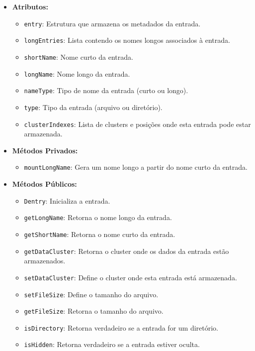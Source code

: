 \documentclass[
    12pt,				%
    oneside,   	        %
    a4paper,			%
    english,			%
    french,				%
    spanish,			%
    brazil,				%
    ]{pacotes/abntex2}
\begin{document}
\begin{itemize}
    \item \textbf{Atributos:}
        \begin{itemize}
            \item \texttt{entry}: Estrutura que armazena os metadados da entrada.
            \item \texttt{longEntries}: Lista contendo os nomes longos associados à entrada.
            \item \texttt{shortName}: Nome curto da entrada.
            \item \texttt{longName}: Nome longo da entrada.
            \item \texttt{nameType}: Tipo de nome da entrada (curto ou longo).
            \item \texttt{type}: Tipo da entrada (arquivo ou diretório).
            \item \texttt{clusterIndexes}: Lista de clusters e posições onde esta entrada pode estar armazenada.
        \end{itemize}
    \item \textbf{Métodos Privados:}
        \begin{itemize}
            \item \texttt{mountLongName}: Gera um nome longo a partir do nome curto da entrada.
        \end{itemize}
    \item \textbf{Métodos Públicos:}
        \begin{itemize}
            \item \texttt{Dentry}: Inicializa a entrada.
            \item \texttt{getLongName}: Retorna o nome longo da entrada.
            \item \texttt{getShortName}: Retorna o nome curto da entrada.
            \item \texttt{getDataCluster}: Retorna o cluster onde os dados da entrada estão armazenados.
            \item \texttt{setDataCluster}: Define o cluster onde esta entrada está armazenada.
            \item \texttt{setFileSize}: Define o tamanho do arquivo.
            \item \texttt{getFileSize}: Retorna o tamanho do arquivo.
            \item \texttt{isDirectory}: Retorna verdadeiro se a entrada for um diretório.
            \item \texttt{isHidden}: Retorna verdadeiro se a entrada estiver oculta.

\end{itemize}
\end{itemize}
\end{document}
